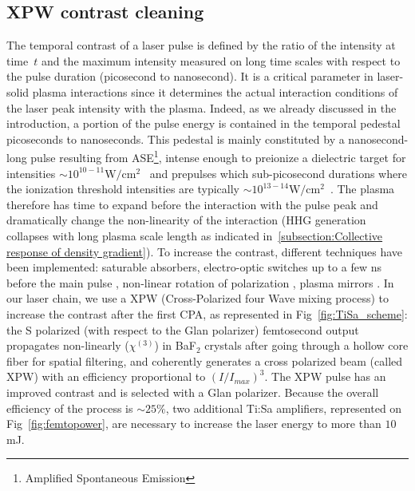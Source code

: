 \subsection{XPW contrast cleaning}
\label{subsection:XPW contrast cleaning}

The temporal contrast of a laser pulse is defined by the ratio of the intensity at time~$t$ and the maximum intensity measured on long time scales with respect to the pulse duration (picosecond to nanosecond). It is a critical parameter in laser-solid plasma interactions since it determines the actual interaction conditions of the laser peak intensity with the plasma. Indeed, as we already discussed in the introduction, a portion of the pulse energy is contained in the temporal pedestal picoseconds to nanoseconds. This pedestal is mainly constituted by a nanosecond-long pulse resulting from ASE\footnote{Amplified Spontaneous Emission}, intense enough to preionize a dielectric target for intensities $\sim 10^{10-11}\mathrm{W/cm^2}$~\cite{bloembergen1970fundamentals,stuart1995laser} and prepulses which sub-picosecond durations where the ionization threshold intensities are typically $\sim 10^{13-14}\mathrm{W/cm^2}$~\cite{gamaly2002ablation}. The plasma therefore has time to expand before the interaction with the pulse peak and dramatically change the non-linearity of the interaction (HHG generation collapses with long plasma scale length as indicated in~\ref{subsection:Collective response of density gradient}\label{subsubsection:Collective response of density gradient}). To increase the contrast, different techniques have been implemented: saturable absorbers, electro-optic switches up to a few ns before the main pulse \cite{nantel1998temporal}, non-linear rotation of polarization \cite{homoelle2002pulse,tapie1992shaping}, plasma mirrors \cite{doumy2004complete,kapteyn1991prepulse,ziener2003specular}. In our laser chain, we use a XPW (Cross-Polarized four Wave mixing process)\cite{jullien200510} to increase the contrast after the first CPA, as represented in Fig~\ref{fig:TiSa_scheme}: the S polarized (with respect to the Glan polarizer) femtosecond output propagates non-linearly ($\chi^{(3)}$) in BaF$_2$ crystals after going through a hollow core fiber for spatial filtering, and coherently generates a cross polarized beam (called XPW) with an efficiency proportional to $(I/I_{max})^3$. The XPW pulse has an improved contrast and is selected with a Glan polarizer. Because the overall efficiency of the process is $\sim 25\%$, two additional Ti:Sa amplifiers, represented on Fig~\ref{fig:femtopower}, are necessary to increase the laser energy to more than $10$mJ. \\



